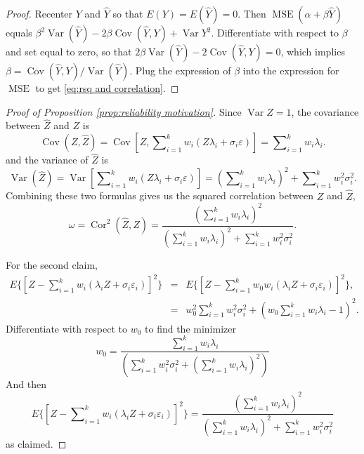 \documentclass[twoside]{article}
\DeclareMathOperator{\Var}{Var}
\DeclareMathOperator{\Cor}{Cor}
\DeclareMathOperator{\Cov}{Cov}
\DeclareMathOperator{\MSE}{MSE}
\DeclareMathOperator{\tsum}{\textstyle \sum}
\begin{document}
\begin{proof}
Recenter $Y$ and $\hat{Y}$ so that $E(Y)=E(\hat{Y})=0$. Then $\MSE(\alpha+\beta\hat{Y})$ equals $\beta^{2}\Var(\hat{Y})-2\beta\Cov(\hat{Y},Y)+\Var Y^{2}$.
Differentiate with respect to $\beta$ and set equal to zero, so that
$2\beta\Var(\hat{Y})-2\Cov(\hat{Y},Y)=0$, which implies $\beta=\Cov(\hat{Y},Y)/\Var(\hat{Y})$. Plug the expression of $\beta$ into the expression for $\MSE$ to get \cref{eq:rsq and correlation}.
\end{proof}

\begin{proof}[Proof of Proposition \ref{prop:reliability motivation}]\label{proof:reliability motivation}
Since $\Var Z=1$, the covariance between $\hat{Z}$ and $Z$
is
\begin{equation}
\Cov(Z,\hat{Z})=\Cov[Z,{\textstyle\tsum_{i=1}^{k}w_{i}}(Z\lambda_{i}+\sigma_{i}\varepsilon)]  =  {\textstyle\tsum_{i=1}^{k}w_{i}}\lambda_{i}.
\end{equation}
and the variance of $\hat{Z}$ is
\[
\Var(\hat{Z})=\Var[{\textstyle\tsum_{i=1}^{k}}w_{i}(Z\lambda_{i}+\sigma_{i}\varepsilon)]
=({\textstyle\tsum_{i=1}^{k}}w_{i}\lambda_{i})^{2}+\tsum_{i=1}^{k}w_{i}^{2}\sigma_{i}^{2}.
\]
Combining these two formulas gives us the squared correlation between
$Z$ and $\hat{Z}$,
\begin{equation}
\omega=\Cor^{2}(\hat{Z},Z) = \frac{(\tsum_{i=1}^{k}w_{i}\lambda_{i})^{2}}{(\tsum_{i=1}^{k}w_{i}\lambda_{i})^{2}+\tsum_{i=1}^{k}w_{i}^{2}\sigma_{i}^{2}}.
\end{equation}

For the second claim,
\begin{eqnarray*}
E\{ [Z-\tsum_{i=1}^{k}w_{i}(\lambda_{i}Z+\sigma_{i}\varepsilon_{i})]^{2}\}  & = & E\{ [Z-\tsum_{i=1}^{k}w_{0}w_{i}(\lambda_{i}Z+\sigma_{i}\varepsilon_{i})]^{2}\} ,\\
 & = & w_{0}^{2}\tsum_{i=1}^{k}w_{i}^{2}\sigma_{i}^{2}+(w_{0}\tsum_{i=1}^{k}w_{i}\lambda_{i}-1)^{2}.
\end{eqnarray*}
Differentiate with respect to $w_{0}$ to find the minimizer
\[
w_{0}=\frac{\tsum_{i=1}^{k}w_{i}\lambda_{i}}{(\tsum_{i=1}^{k}w_{i}^{2}\sigma_{i}^{2}+(\tsum_{i=1}^{k}w_{i}\lambda_{i})^{2})}
\]
And then
\[
E\{[Z-\tsum_{i=1}^{k}w_{i}(\lambda_{i}Z+\sigma_{i}\varepsilon_{i})]^{2}\} =\frac{(\tsum_{i=1}^{k}w_{i}\lambda_{i})^{2}}{(\tsum_{i=1}^{k}w_{i}\lambda_{i})^{2}+\tsum_{i=1}^{k}w_{i}^{2}\sigma_{i}^{2}}
\]
as claimed.
\end{proof}
\end{document}
